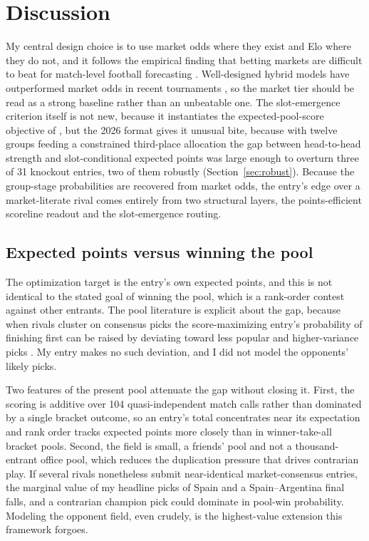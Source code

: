 \documentclass[11pt,letterpaper]{article}
\begin{document}
\section{Discussion}

My central design choice is to use market odds where they exist and Elo where they do not, and it follows the empirical finding that betting markets are difficult to beat for match-level football forecasting \citep{strumbelj2014, leitner2010, hvattum2010}. Well-designed hybrid models have outperformed market odds in recent tournaments \citep{groll2019}, so the market tier should be read as a strong baseline rather than an unbeatable one. The slot-emergence criterion itself is not new, because it instantiates the expected-pool-score objective of \citet{kaplangarstka2001}, but the 2026 format gives it unusual bite, because with twelve groups feeding a constrained third-place allocation the gap between head-to-head strength and slot-conditional expected points was large enough to overturn three of 31 knockout entries, two of them robustly (Section~\ref{sec:robust}). Because the group-stage probabilities are recovered from market odds, the entry's edge over a market-literate rival comes entirely from two structural layers, the points-efficient scoreline readout and the slot-emergence routing.

\subsection{Expected points versus winning the pool}\label{sec:objective}

The optimization target is the entry's own expected points, and this is not identical to the stated goal of winning the pool, which is a rank-order contest against other entrants. The pool literature is explicit about the gap, because when rivals cluster on consensus picks the score-maximizing entry's probability of finishing first can be raised by deviating toward less popular and higher-variance picks \citep{clairletscher2007, kaplangarstka2001}. My entry makes no such deviation, and I did not model the opponents' likely picks.

Two features of the present pool attenuate the gap without closing it. First, the scoring is additive over 104 quasi-independent match calls rather than dominated by a single bracket outcome, so an entry's total concentrates near its expectation and rank order tracks expected points more closely than in winner-take-all bracket pools. Second, the field is small, a friends' pool and not a thousand-entrant office pool, which reduces the duplication pressure that drives contrarian play. If several rivals nonetheless submit near-identical market-consensus entries, the marginal value of my headline picks of Spain and a Spain--Argentina final falls, and a contrarian champion pick could dominate in pool-win probability. Modeling the opponent field, even crudely, is the highest-value extension this framework forgoes.
\end{document}

